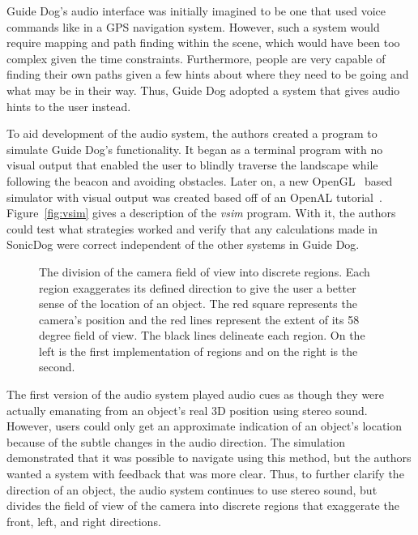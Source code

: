 Guide Dog's audio interface was initially imagined to be one that used voice
commands like in a GPS navigation system. However, such a system would require
mapping and path finding within the scene, which would have been too complex
given the time constraints. Furthermore, people are very capable of finding
their own paths given a few hints about where they need to be going and what
may be in their way. Thus, Guide Dog adopted a system that gives audio hints to
the user instead.

To aid development of the audio system, the authors created a program to
simulate Guide Dog's functionality. It began as a terminal program with no
visual output that enabled the user to blindly traverse the landscape while
following the beacon and avoiding obstacles. Later on, a new
OpenGL~\cite{opengl-website} based simulator with visual output was created
based off of an OpenAL tutorial~\cite{openal-tutorial}.  Figure~\ref{fig:vsim}
gives a description of the \emph{vsim} program. With it, the authors could test
what strategies worked and verify that any calculations made in SonicDog were
correct independent of the other systems in Guide Dog.

\begin{figure}
\caption{The division of the camera field of view into discrete regions. Each
region exaggerates its defined direction to give the user a better sense of the
location of an object. The red square represents the camera's position and the
red lines represent the extent of its 58 degree field of view. The black lines
delineate each region. On the left is the first implementation of regions and
on the right is the second.}
\label{fig:regions}
\end{figure}

The first version of the audio system played audio cues as though they were
actually emanating from an object's real 3D position using stereo sound.
However, users could only get an approximate indication of an object's location
because of the subtle changes in the audio direction. The simulation
demonstrated that it was possible to navigate using this method, but the authors
wanted a system with feedback that was more clear. Thus, to further clarify the
direction of an object, the audio system continues to use stereo sound, but
divides the field of view of the camera into discrete regions that exaggerate
the front, left, and right directions.

